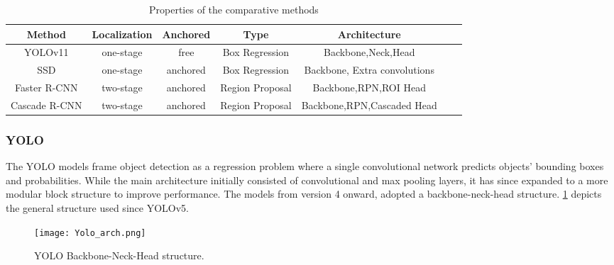 \begin{table}[!htb]
\begin{center}
\caption{Properties of the comparative methods}
\begin{tabular}{c|cccccc}
\hline
Method&Localization&Anchored&Type&Architecture \\
\hline\hline
YOLOv11&one-stage&free&Box Regression&Backbone,Neck,Head\\
SSD&one-stage&anchored&Box Regression&Backbone, Extra convolutions\\
Faster R-CNN&two-stage&anchored&Region Proposal&Backbone,RPN,ROI Head\\
Cascade R-CNN&two-stage&anchored&Region Proposal&Backbone,RPN,Cascaded Head\\
\hline
\end{tabular}\label{tb:architecture overview}
\end{center}
\end{table}



\subsubsection{YOLO}
\label{sec:YOLO}

The YOLO models frame object detection as a regression problem where a single convolutional network predicts objects' bounding boxes and probabilities. While the main architecture initially consisted of convolutional and max pooling layers, it has since expanded to a more modular block structure to improve performance. The models from version 4 onward, adopted a backbone-neck-head structure. \cref{fig:yoloarch} depicts the general structure used since YOLOv5. 

\begin{figure}[!htb]
\centering
\texttt{[image: Yolo\_arch.png]}
\caption{YOLO Backbone-Neck-Head structure.}
\label{fig:yoloarch}
\end{figure}

